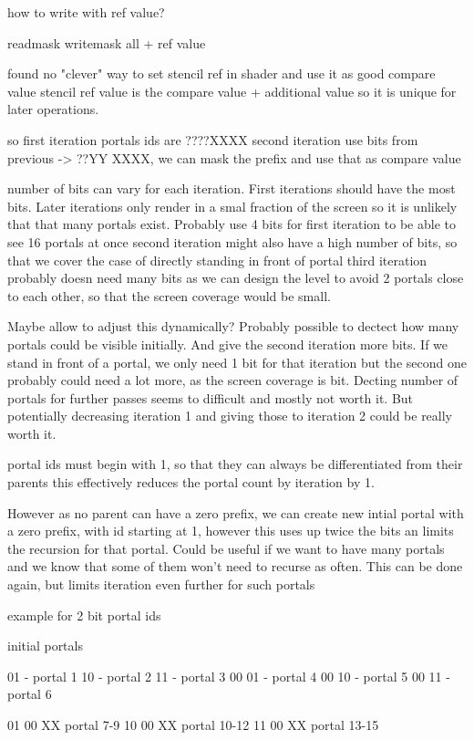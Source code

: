 how to write with ref value?

readmask
writemask all + ref value

found no "clever" way to set stencil ref in shader and use it as good compare value
stencil ref value is the compare value + additional value so it is unique for later operations.

so first iteration portals ids are ????XXXX
second iteration use bits from previous -> ??YY XXXX, we can mask the prefix and use that as compare value

number of bits can vary for each iteration. First iterations should have the most bits. Later iterations only render in a smal fraction of the screen so it is unlikely that that many portals exist.
Probably use 4 bits for first iteration to be able to see 16 portals at once
second iteration might also have a high number of bits, so that we cover the case of directly standing in front of portal
third iteration probably doesn need many bits as we can design the level to avoid 2 portals close to each other, so that the screen coverage would be small.

Maybe allow to adjust this dynamically? Probably possible to dectect how many portals could be visible initially. And give the second iteration more bits. If we stand in front of a portal, we only need 1 bit for that iteration but the second one probably could need a lot more, as the screen coverage is bit.
Decting number of portals for further passes seems to difficult and mostly not worth it. But potentially decreasing iteration 1 and giving those to iteration 2 could be really worth it.


portal ids must begin with 1, so that they can always be differentiated from their parents
this effectively reduces the portal count by iteration by 1.

However as no parent can have a zero prefix, we can create new intial portal with a zero prefix, with id starting at 1, however this uses up twice the bits an limits the recursion for that portal. Could be useful if we want to have many portals and we know that some of them won't need to recurse as often.
This can be done again, but limits iteration even further for such portals

example for 2 bit portal ids

initial portals

01 - portal 1
10 - portal 2
11 - portal 3
00 01 - portal 4
00 10 - portal 5
00 11 - portal 6

01 00 XX portal 7-9
10 00 XX portal 10-12
11 00 XX portal 13-15

